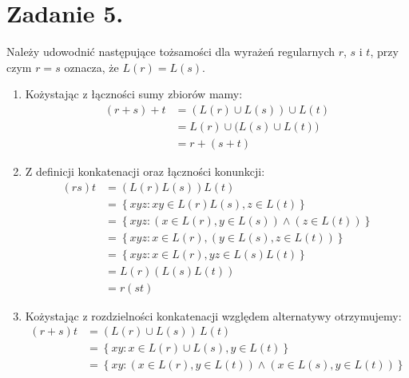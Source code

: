 \documentclass[11pt,a4paper]{article}
\numberwithin{equation}{section}
\begin{document}
\section{Zadanie 5.}
Należy udowodnić następujące tożsamości dla wyrażeń regularnych $r$, $s$ i $t$, przy czym $r=s$ oznacza, że $L(r) = L(s)$.
\begin{enumerate}
    \item
        Kożystając z łączności sumy zbiorów mamy:
        \begin{equation}
            \begin{aligned}
                (r+s)+t &= (L(r)\cup L(s))\cup L(t) \\
                        &= L(r)\cup\bigl(L(s)\cup L(t)\bigr) \\
                        &= r + (s+t)
            \end{aligned}
        \end{equation}
    \item Z definicji konkatenacji oraz łączności konunkcji:
        \begin{equation}
            \begin{aligned}
                (rs)t &= (L(r)L(s))L(t) \\
                        &= \left\{ xyz: xy \in L(r)L(s), z \in L(t) \right\} \\
                        &= \left\{ xyz: \left( x \in L(r), y \in L(s) \right) \wedge \left( z \in L(t) \right) \right\} \\
                        &= \left\{ xyz: x \in L(r), \left( y \in L(s), z \in L(t) \right) \right\} \\
                        &= \left\{ xyz: x \in L(r), yz \in L(s)L(t) \right\} \\
                        &= L(r)(L(s)L(t)) \\
                        &= r(st)
            \end{aligned}
        \end{equation}
    \item Kożystając z rozdzielności konkatenacji względem alternatywy otrzymujemy:
        \begin{equation}
            \begin{aligned}
                (r+s) t &= (L(r)\cup L(s))\,L(t) \\
                        &= \left\{ xy: x \in L(r)\cup L(s), y \in L(t) \right\} \\
                        &= \left\{ xy: \left( x \in L(r), y \in L(t)\right) \wedge \left( x \in L(s), y \in L(t)\right) \right\} \\

\end{aligned}
\end{equation}
\end{enumerate}
\end{document}
